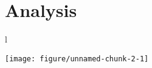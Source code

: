 




\section{Analysis}
\label{sec:analysis}
l

\begin{knitrout}
\color{fgcolor}
\texttt{[image: figure/unnamed-chunk-2-1]} 

\end{knitrout}
 








